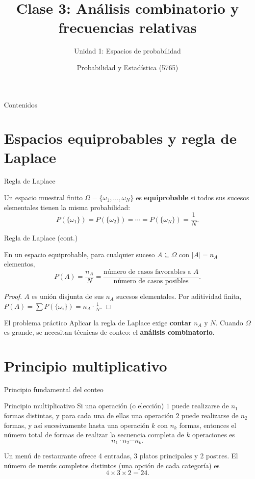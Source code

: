 \documentclass[aspectratio=169,11pt]{beamer}
\title[Prob. y Estadística]{Clase 3: Análisis combinatorio y frecuencias relativas}
\subtitle{Unidad 1: Espacios de probabilidad}
\institute[UNS]{Universidad Nacional del Sur \\ Departamento de Matemática}
\author{Probabilidad y Estadística (5765)}
\date{}
\begin{document}
\begin{frame}
\titlepage
\end{frame}

\begin{frame}{Contenidos}
\tableofcontents
\end{frame}

\section{Espacios equiprobables y regla de Laplace}

\begin{frame}{Regla de Laplace}
\begin{definition}
Un espacio muestral finito $\Omega=\{\omega_1,\dots,\omega_N\}$ es \textbf{equiprobable} si todos sus sucesos elementales tienen la misma probabilidad:
\[
P(\{\omega_1\}) = P(\{\omega_2\}) = \cdots = P(\{\omega_N\}) = \frac{1}{N}.
\]
\end{definition}
\end{frame}

\begin{frame}{Regla de Laplace (cont.)}
\begin{theorem}
En un espacio equiprobable, para cualquier suceso $A\subseteq\Omega$ con $|A|=n_A$ elementos,
\[
P(A) = \frac{n_A}{N} = \frac{\text{número de casos favorables a } A}{\text{número de casos posibles}}.
\]
\end{theorem}
\begin{proof}
$A$ es unión disjunta de sus $n_A$ sucesos elementales. Por aditividad finita, $P(A)=\sum P(\{\omega_i\}) = n_A \cdot \frac{1}{N}$.
\end{proof}
\begin{alertblock}{El problema práctico}
Aplicar la regla de Laplace exige \textbf{contar} $n_A$ y $N$. Cuando $\Omega$ es grande, se necesitan técnicas de conteo: el \textbf{análisis combinatorio}.
\end{alertblock}
\end{frame}

\section{Principio multiplicativo}

\begin{frame}{Principio fundamental del conteo}
\begin{block}{Principio multiplicativo}
Si una operación (o elección) $1$ puede realizarse de $n_1$ formas distintas, y para cada una de ellas una operación $2$ puede realizarse de $n_2$ formas, y así sucesivamente hasta una operación $k$ con $n_k$ formas, entonces el número total de formas de realizar la secuencia completa de $k$ operaciones es
\[
n_1 \cdot n_2 \cdots n_k.
\]
\end{block}
\begin{example}
Un menú de restaurante ofrece 4 entradas, 3 platos principales y 2 postres. El número de menús completos distintos (una opción de cada categoría) es
\[
4 \times 3 \times 2 = 24.
\]
\end{example}
\end{frame}
\end{document}
